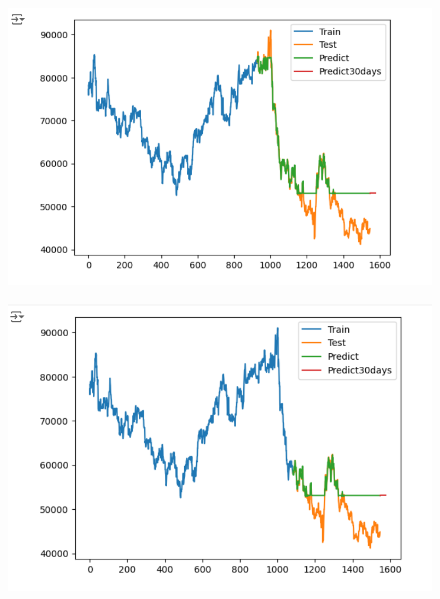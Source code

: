 \documentclass{article}
\begin{document}
\begin{multicols}{2}
\begin{figure}[H]
    \centering
    \begin{minipage}{0.15\textwidth}
    \centering
    \includegraphics[width=1\textwidth]{Image/GradientBoosting/SAMSUNG_30_6_4_GradientBoostingRegressor.png}
   
    \label{fig:1}
    \end{minipage}%
    \begin{minipage}{0.15\textwidth}
    \centering
    \includegraphics[width=1\textwidth]{Image/GradientBoosting/SAMSUNG_30_7_3_GradientBoostingRegressor.png}
  

\end{minipage}
\end{figure}
\end{multicols}
\end{document}

